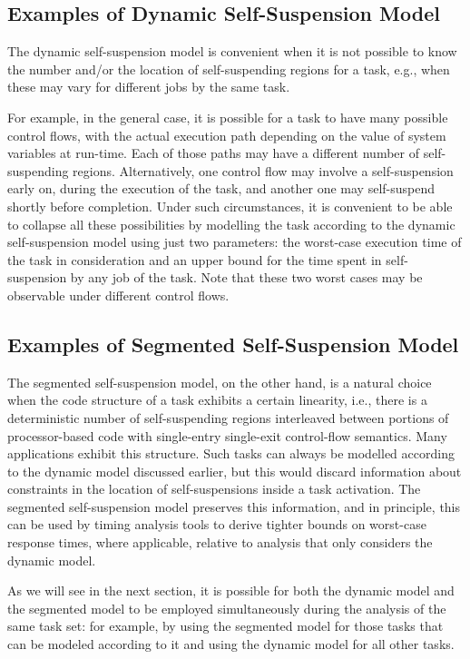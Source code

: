 \subsection{Examples of Dynamic Self-Suspension Model} 
The dynamic self-suspension model is convenient when it is not possible to know  the number and/or the location of self-suspending regions for a task, e.g., when these may vary for different jobs by the same task.

For example, in the general case, it is possible for a task to have many possible control flows, with the actual execution path depending on the value
of system variables at run-time. Each of those paths may have a different
number of self-suspending regions. Alternatively, one control flow may involve a self-suspension early on, during the execution of the task, and
another one may self-suspend shortly before completion. Under such circumstances, it is convenient to be able to collapse all these possibilities
by modelling the task according to the dynamic self-suspension model using
just two parameters: the worst-case execution time of the task in consideration and an upper bound for the time spent in self-suspension by any job of the task. Note that these two worst cases may be observable under different control flows.
  
\subsection{Examples of Segmented Self-Suspension Model} 
The segmented self-suspension model, on the other hand, is a natural choice when the code structure of a task exhibits a certain linearity, i.e., there is a deterministic number of self-suspending regions interleaved between portions of processor-based code with single-entry single-exit control-flow semantics. Many applications exhibit this structure. Such tasks can always be modelled according to the dynamic model discussed earlier, but this would discard information about constraints in the location of self-suspensions inside a task activation. The segmented self-suspension model preserves this information, and in principle, this can be used by timing analysis tools to derive tighter bounds on worst-case response times, where applicable, relative to analysis that only considers the dynamic model. 

As we will see in the next section, it is possible for both the dynamic model and the segmented model to be employed simultaneously during the analysis of the same task set: for example, by using the segmented model for those tasks that can be modeled according to it and using the dynamic model for all other tasks.

